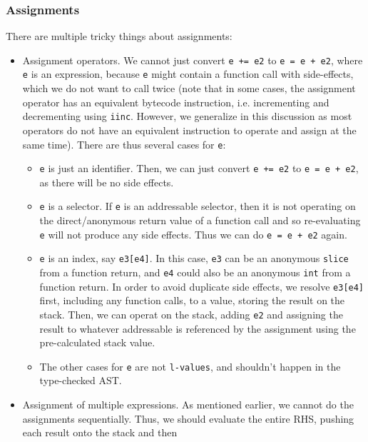 \documentclass[11pt]{article}
\begin{document}
\subsubsection{Assignments}

There are multiple tricky things about assignments:

\begin{itemize}[noitemsep]
\item Assignment operators. We cannot just convert \texttt{e += e2} to
  \texttt{e = e + e2}, where \texttt{e} is an expression, because
  \texttt{e} might contain a function call with side-effects, which we
  do not want to call twice (note that in some cases, the assignment
  operator has an equivalent bytecode instruction, i.e. incrementing
  and decrementing using \texttt{iinc}. However, we generalize in this
  discussion as most operators do not have an equivalent instruction
  to operate and assign at the same time). There are thus several
  cases for \texttt{e}:
  \begin{itemize}[noitemsep]
  \item \texttt{e} is just an identifier. Then, we can just convert
    \texttt{e += e2} to \texttt{e = e + e2}, as there will be no side
    effects.
  \item \texttt{e} is a selector. If \texttt{e} is an addressable
    selector, then it is not operating on the direct/anonymous return
    value of a function call and so re-evaluating \texttt{e} will not
    produce any side effects. Thus we can do \texttt{e = e + e2}
    again.
  \item \texttt{e} is an index, say \texttt{e3[e4]}. In this case,
    \texttt{e3} can be an anonymous \texttt{slice} from a function
    return, and \texttt{e4} could also be an anonymous \texttt{int}
    from a function return. In order to avoid duplicate side effects,
    we resolve \texttt{e3[e4]} first, including any function calls,
    to a value, storing the result on the stack. Then, we can operat
    on the stack, adding \texttt{e2} and assigning the result to whatever
    addressable is referenced by the assignment using the pre-calculated
    stack value.
  \item The other cases for \texttt{e} are not \texttt{l-values}, and
    shouldn't happen in the type-checked AST.\@
  \end{itemize}
  \item Assignment of multiple expressions. As mentioned earlier, we
    cannot do the assignments sequentially. Thus, we should evaluate
    the entire RHS, pushing each result onto the stack and then

\end{itemize}
\end{document}
